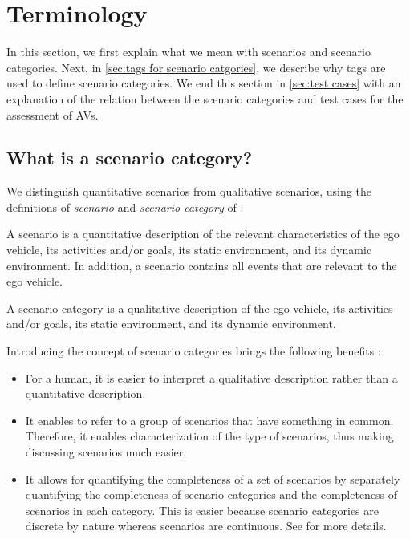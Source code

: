 \section{Terminology}
\label{sec:scenario category}

In this section, we first explain what we mean with scenarios and scenario categories. Next, in \cref{sec:tags for scenario catgories}, we describe why tags are used to define scenario categories. We end this section in \cref{sec:test cases} with an explanation of the relation between the scenario categories and test cases for the assessment of AVs.



\subsection{What is a scenario category?}
\label{sec:definition scenario category}

We distinguish quantitative scenarios from qualitative scenarios, using the definitions of \emph{scenario} and \emph{scenario category} of \autocite{degelder2020ontology}:

\begin{definition}[Scenario]
	\label{def:scenario}
	A scenario is a quantitative description of the relevant characteristics of the ego vehicle, its activities and/or goals, its static environment, and its dynamic environment. In addition, a scenario contains all events that are relevant to the ego vehicle.
\end{definition}

\begin{definition}
	\label{def:scenario category}
	A scenario category is a qualitative description of the ego vehicle, its activities and/or goals, its static environment, and its dynamic environment.
\end{definition}

Introducing the concept of scenario categories brings the following benefits \autocite{degelder2020ontology}:
\begin{itemize}
	\item For a human, it is easier to interpret a qualitative description rather than a quantitative description.
	\item It enables to refer to a group of scenarios that have something in common. Therefore, it enables characterization of the type of scenarios, thus making discussing scenarios much easier.
	\item It allows for quantifying the completeness of a set of scenarios by separately quantifying the completeness of scenario categories and the completeness of scenarios in each category.
	This is easier because scenario categories are discrete by nature whereas scenarios are continuous. See \autocite{degelder2019completeness} for more details.
\end{itemize}

